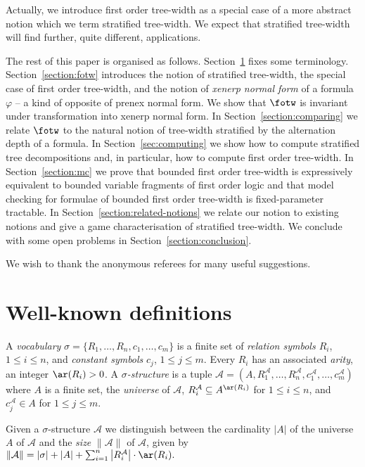 \documentclass{LMCS}
\renewcommand{\phi}{\varphi}
\newcommand{\mM}{\mathcal A}
\begin{document}
Actually, we introduce first order tree-width 
as a special case of a more abstract notion 
which we term stratified tree-width. 
We expect that stratified tree-width 
will find further, quite different, applications. 

The rest of this paper is organised as follows. 
Section~\ref{sec:prems} fixes some terminology. 
Section~\ref{section:fotw} introduces the notion 
of stratified tree-width, the special case of first order tree-width, 
and the notion of \emph{xenerp normal form} of a formula $\phi$ -- 
a kind of opposite of prenex normal form. 
We show that $\fotw$ is invariant under transformation into xenerp normal form.
In Section~\ref{section:comparing} we relate $\fotw$ to the
natural notion of tree-width stratified by 
the alternation depth of a formula.
In Section~\ref{sec:computing} 
we show how to compute stratified tree decompositions 
and, in particular, how to compute first order tree-width. 
In Section~\ref{section:mc} we prove 
that bounded first order tree-width 
is expressively equivalent to bounded variable fragments of first order logic
and that model checking for formulae of bounded first order tree-width 
is fixed-parameter tractable. 
In Section~\ref{section:related-notions} 
we relate our notion to existing notions 
and give a game characterisation of stratified tree-width. 
We conclude with some open problems in Section~\ref{section:conclusion}. 

We wish to thank the anonymous referees for many useful suggestions. 


\section{Well-known definitions}\label{sec:prems}

A \emph{vocabulary} $\sigma=\{R_1,\ldots, R_n, c_1,\ldots,c_m\}$
is a finite set of \emph{relation symbols $R_i$}, $1\le i\le n$, and
\emph{constant symbols} $c_j$, $1\le j\le m$. 
Every $R_i$ has an associated \emph{arity}, an integer $\ar(R_i)> 0$.
A \emph{$\sigma$-structure} is a tuple 
$\mM=(A,R^{\mM}_1,\ldots, R^{\mM}_n,c^{\mM}_1,\ldots, c^{\mM}_m)$ where $A$ is
a finite set, the \emph{universe} of $\mM$, 
$R^{\mM}_i\subseteq A^{\ar(R_i)}$ for $1\leq i\leq n$, and
$c^{\mM}_j\in A$ for $1\leq j\leq m$.

Given a $\sigma$-structure $\mM$ we distinguish between the cardinality
$\left|A\right|$ of the universe $A$ of $\mM$ 
and the \emph{size} $\|\mM\|$ of $\mM$, given by 
$
	\|\mM\|=\left|\sigma\right|+\left|A\right|+
	\sum_{i=1}^n\left|R_i^{\mM}\right|\cdot\ar(R_i).
$ 
\end{document}
